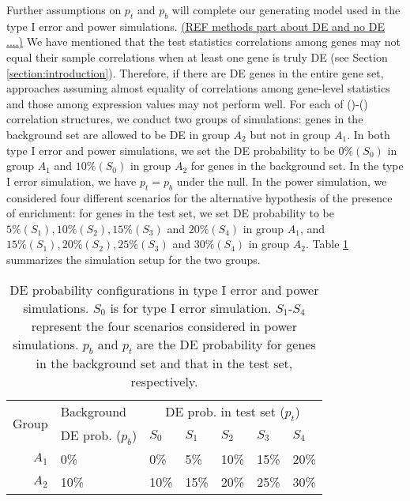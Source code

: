 	Further assumptions on $p_t$ and $p_b$ will complete our generating model used in the type I 
	error and power simulations. \underline{(REF methods part about DE and no DE ....)}
	We have mentioned that the test statistics correlations among genes may
	not equal their sample correlations when at least one gene is truly DE (see Section 
	\ref{section:introduction}). Therefore, if there are 
	DE genes in the entire gene set, approaches assuming
	almost equality of correlations among gene-level statistics and those among expression values 
	may not perform well. For each of 
	(\aaCase)-(\fCase) correlation structures, we conduct two groups of simulations: genes in the 
	background set are allowed to be DE in group $A_2$ but 
	not in group $A_1$.  In both type I error and power 
	simulations, we set the DE
	probability to be $0\%(S_0)$ in group $A_1$ and $10\%(S_0)$ in group $A_2$ for genes in the
	background set.
	 In the type I error simulation, we have $p_t = p_b$ under the null. In the power
	simulation, we considered four different scenarios for the alternative hypothesis of the 
	presence of enrichment: for genes in the test set, we set DE
	probability to be $5\% (S_1), 10\%(S_2), 15\%(S_3)$ and $20\%(S_4)$ in group $A_1$, and 
	$15\%(S_1),
	20\%(S_2), 25\%(S_3)$ and $30\%(S_4)$ in group $A_2$. Table \ref{table:simusetup} summarizes the
	simulation setup for the two groups.
	

	
	\begin{table}[!ht]
		\centering
		\caption[DE probability configurations in type I error and power simulations]{DE 
		probability configurations in type I error and power simulations. $S_0$ is for
			type I error simulation. $S_1$-$S_4$ represent the four scenarios considered in power 
			simulations. $p_b$ and $p_t$ are the DE probability for genes in the background set and 
			that in the test set, respectively.}
		
		\begin{tabular}{rp{3.7cm}p{1.5cm}p{1.5cm}p{1.5cm}p{1.5cm}p{1.5cm}}
			\hline
			\multirow{2}{*}{Group} & 	Background & \multicolumn{5}{c}{DE prob. in test set 
			($p_t$)}\\
			&DE prob. ($p_b$)&$S_0$ &$S_1$ &$S_2$ &$S_3$ &$S_4$\\
		\hline
			$A_1$ & 0\% & 0\%  & 5\% & 10\% & 15\% & 20\%\\ 
			$A_2$ & 10\% & 10\% & 15\%& 20\%& 25\% & 30\%\\  
		\hline
		\end{tabular}
		
		\label{table:simusetup}
	\end{table}
	
